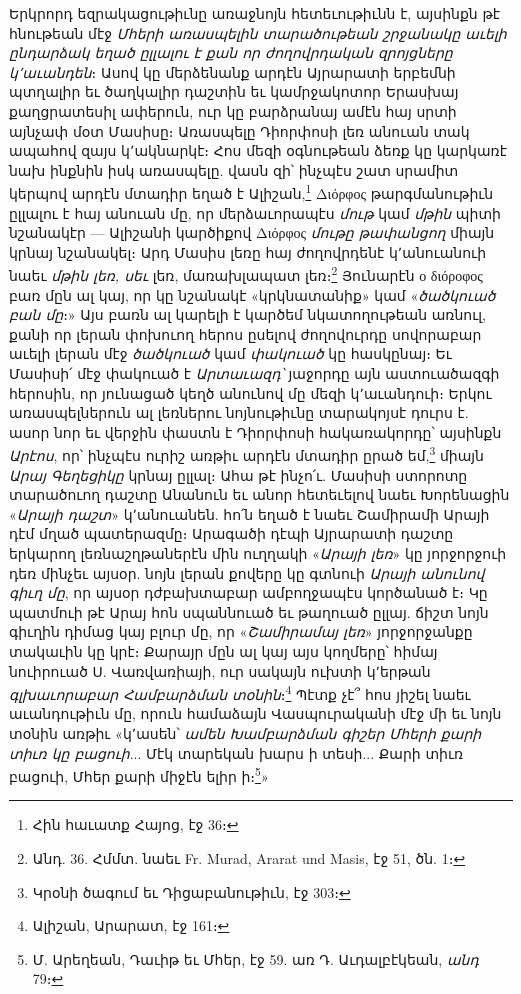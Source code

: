 \documentclass{article}
\begin{document}
{Երկրորդ եզրակացութիւնը առաջնոյն հետեւութիւնն է, այսինքն թէ հնութեան մէջ \emph{Մհերի առասպելին տարածութեան շրջանակը աւելի ընդարձակ եղած ըլլալու է քան որ ժողովրդական զրոյցները կ՚աւանդեն}։ Ասով կը մերձենանք արդէն Այրարատի երբեմնի պտղալիր եւ ծաղկալիր դաշտին եւ կամրջակոտոր Երասխայ քաղցրատեսիլ ափերուն, ուր կը բարձրանայ ամէն հայ սրտի այնչափ մօտ Մասիսը։ Առասպելը Դիորփոսի լեռ անուան տակ ապահով զայս կ՚ակնարկէ։ Հոս մեզի օգնութեան ձեռք կը կարկառէ նախ ինքնին իսկ առասպելը. վասն զի՝ ինչպէս շատ սրամիտ կերպով արդէն մտադիր եղած է Ալիշան,\footnote{Հին հաւատք Հայոց, էջ 36։} Διόρφος թարգմանութիւն ըլլալու է հայ անուան մը, որ մերձաւորապէս \emph{մութ} կամ \emph{մթին} պիտի նշանակէր — Ալիշանի կարծիքով Διόρφος \emph{մութը թափանցող} միայն կրնայ նշանակել։ Արդ Մասիս լեռը հայ ժողովրդենէ կ՚անուանուի նաեւ \emph{մթին լեռ, սեւ} լեռ, մառախլապատ լեռ։\footnote{Անդ. 36. Հմմտ. նաեւ Fr. Murad, Ararat und Masis, էջ 51, ծն. 1։} Յունարէն ο διόροφος բառ մըն ալ կայ, որ կը նշանակէ «կրկնատանիք» կամ «\emph{ծածկուած բան մը}։» Այս բառն ալ կարելի է կարծեմ նկատողութեան առնուլ, քանի որ լերան փոխուող հերոս ըսելով ժողովուրդը սովորաբար աւելի լերան մէջ \emph{ծածկուած} կամ \emph{փակուած} կը հասկընայ։ Եւ Մասիսի՛ մէջ փակուած է \emph{Արտաւազդ՝} յաջորդը այն աստուածազգի հերոսին, որ յունացած կեղծ անունով մը մեզի կ՚աւանդուի։ Երկու առասպելներուն ալ լեռներու նոյնութիւնը տարակոյսէ դուրս է. ասոր նոր եւ վերջին փաստն է Դիորփոսի հակառակորդը՝ այսինքն \emph{Արէոս}, որ՝ ինչպէս ուրիշ առթիւ արդէն մտադիր ըրած եմ,\footnote{Կրօնի ծագում եւ Դիցաբանութիւն, էջ 303։} միայն \emph{Արայ Գեղեցիկը} կրնայ ըլլալ։ Ահա թէ ինչո՛ւ. Մասիսի ստորոտը տարածուող դաշտը Անանուն եւ անոր հետեւելով նաեւ Խորենացին «\emph{Արայի դաշտ}» կ՚անուանեն. հո՛ն եղած է նաեւ Շամիրամի Արայի դէմ մղած պատերազմը։ Արագածի դէպի Այրարատի դաշտը երկարող լեռնաշղթաներէն մին ուղղակի «\emph{Արայի լեռ}» կը յորջորջուի դեռ մինչեւ այսօր. նոյն լերան քովերը կը գտնուի \emph{Արայի անունով գիւղ մը}, որ այսօր դժբախտաբար ամբողջապէս կործանած է։ Կը պատմուի թէ Արայ հոն սպաննուած եւ թաղուած ըլլայ. ճիշտ նոյն գիւղին դիմաց կայ բլուր մը, որ «\emph{Շամիրամայ լեռ}» յորջորջանքը տակաւին կը կրէ։ Քարայր մըն ալ կայ այս կողմերը՝ հիմայ նուիրուած Ս. Վառվառիայի, ուր սակայն ուխտի կ՚երթան \emph{գլխաւորաբար Համբարձման տօնին}։\footnote{Ալիշան, Արարատ, էջ 161։} Պէտք չէ՞ հոս յիշել նաեւ աւանդութիւն մը, որուն համաձայն Վասպուրականի մէջ մի եւ նոյն տօնին առթիւ «կ՚ասեն՝ \emph{ամեն Խամբարձման գիշեր Մհերի քարի տիւռ կը բացուի}... Մէկ տարեկան խարս ի տեսի... Քարի տիւռ բացուի, Մհեր քարի միջէն ելիր ի։\footnote{Մ. Արեղեան, Դաւիթ եւ Մհեր, էջ 59. առ Դ. Աւդալբէկեան, \emph{անդ} 79։}»

}
\end{document}
